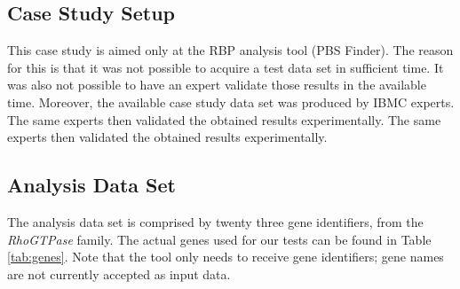 \subsection{Case Study Setup}

This case study is aimed only at the RBP analysis tool (PBS Finder). The reason
for this is that it was not possible to acquire a test data set in sufficient
time. It was also not possible to have an expert validate those results in the
available time. Moreover, the available case study data set was produced by IBMC
experts. The same experts then validated the obtained results experimentally.
The same experts then validated the obtained results experimentally.

\subsection{Analysis Data Set}

The analysis data set is comprised by twenty three gene identifiers, from the
\emph{RhoGTPase} family. The actual genes used for our tests can be found in
Table \ref{tab:genes}. Note that the tool only needs to receive gene
identifiers; gene names are not currently accepted as input data.

